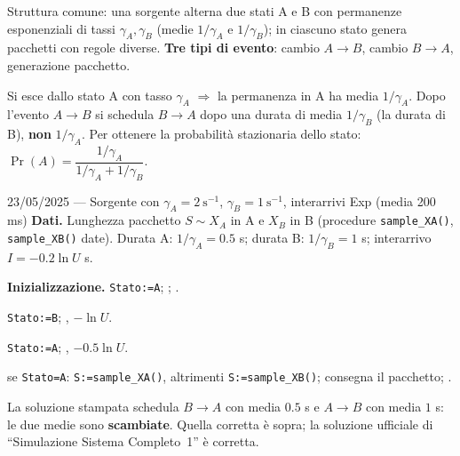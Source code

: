 Struttura comune: una sorgente alterna due stati A e B con permanenze esponenziali di tassi $\gamma_A,\gamma_B$ (medie $1/\gamma_A$ e $1/\gamma_B$); in ciascuno stato genera pacchetti con regole diverse. \textbf{Tre tipi di evento}: cambio $A\to B$, cambio $B\to A$, generazione pacchetto.

\begin{attenzione}
Si esce dallo stato A con tasso $\gamma_A$ $\Rightarrow$ la permanenza in A ha media $1/\gamma_A$. Dopo l'evento $A\to B$ si schedula $B\to A$ dopo una durata di media $1/\gamma_B$ (la durata di B), \textbf{non} $1/\gamma_A$. Per ottenere la probabilità stazionaria dello stato: $\Pr(A)=\dfrac{1/\gamma_A}{1/\gamma_A+1/\gamma_B}$.
\end{attenzione}

\begin{esempio}{23/05/2025 --- Sorgente con $\gamma_A=2\ \mathrm{s^{-1}}$, $\gamma_B=1\ \mathrm{s^{-1}}$, interarrivi Exp (media 200 ms)}
\textbf{Dati.} Lunghezza pacchetto $S\sim X_A$ in A e $X_B$ in B (procedure \texttt{sample\_XA()}, \texttt{sample\_XB()} date). Durata A: $1/\gamma_A=0.5$ s; durata B: $1/\gamma_B=1$ s; interarrivo $I=-0.2\ln U$ s.

\textbf{Inizializzazione.} \texttt{Stato:=A}; ; .
\begin{description}[leftmargin=*,nosep]
\item[Evento A$\to$B] \texttt{Stato:=B}; , \ie $-\ln U$.
\item[Evento B$\to$A] \texttt{Stato:=A}; , \ie $-0.5\ln U$.
\item[Evento generazione] se \texttt{Stato=A}: \texttt{S:=sample\_XA()}, altrimenti \texttt{S:=sample\_XB()}; consegna il pacchetto; .
\end{description}
\begin{attenzione}
La soluzione stampata schedula $B\to A$ con media $0.5$ s e $A\to B$ con media $1$ s: le due medie sono \textbf{scambiate}. Quella corretta è sopra; la soluzione ufficiale di ``Simulazione Sistema Completo~1'' è corretta.
\end{attenzione}
\end{esempio}

